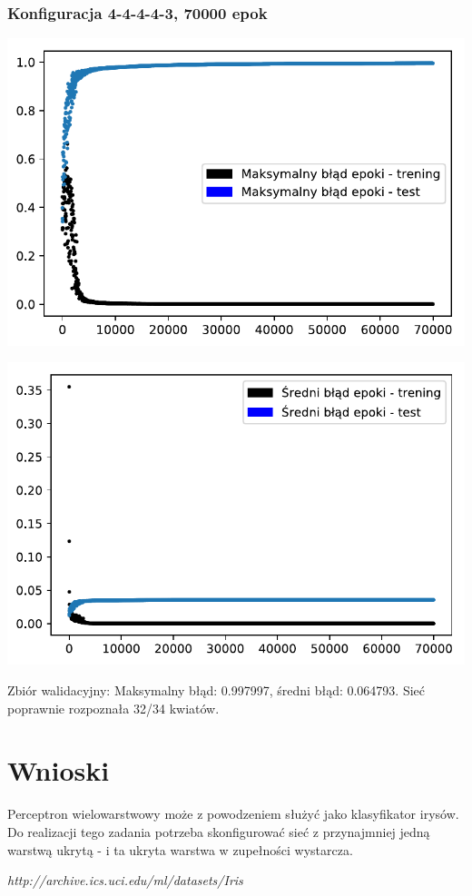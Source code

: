 \documentclass{classrep}
\begin{document}
\subsubsection{Konfiguracja 4-4-4-4-3, 70000 epok}
\begin{center}
  \includegraphics{output_0_3.pdf}
\end{center}
\begin{center}
  \includegraphics{output_0_4.pdf}
\end{center}


Zbiór walidacyjny: Maksymalny błąd: 0.997997, średni błąd: 0.064793.
Sieć poprawnie rozpoznała 32/34 kwiatów.

\newpage
\section{Wnioski}
Perceptron wielowarstwowy może z powodzeniem służyć jako klasyfikator irysów. Do realizacji tego zadania potrzeba skonfigurować sieć z przynajmniej jedną warstwą ukrytą - i ta ukryta warstwa w zupełności wystarcza.
\begin{thebibliography}{0}
    \textsl{http://archive.ics.uci.edu/ml/datasets/Iris}
\end{thebibliography}
\end{document}
